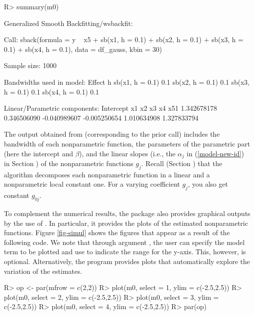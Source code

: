 \begin{Schunk}
\begin{Sinput}
R> summary(m0)
\end{Sinput}
\begin{Soutput}
Generalized Smooth Backfitting/wsbackfit:

Call: sback(formula = y ~ x5 + sb(x1, h = 0.1) + sb(x2, h = 0.1) + 
    sb(x3, h = 0.1) + sb(x4, h = 0.1), data = df_gauss, kbin = 30)

Sample size: 1000 

Bandwidths used in model:
 Effect          h  
 sb(x1, h = 0.1) 0.1
 sb(x2, h = 0.1) 0.1
 sb(x3, h = 0.1) 0.1
 sb(x4, h = 0.1) 0.1

Linear/Parametric components:
   Intercept           x1           x2           x3           x4          x51 
 1.342678178  0.346506090 -0.040989607 -0.005250654  1.010634908  1.327833794  
\end{Soutput}
\end{Schunk}

The output obtained from   (corresponding to the prior   call) includes the bandwidth of each nonparametric function, the parameters of the parametric part (here the intercept and $\beta$), and the linear slopes (i.e., the $\alpha_j$ in (\ref{model-new-id}) in Section ) of the nonparametric functions $g_j$. Recall (Section ) that the algorithm decomposes each nonparametric function in a linear and a nonparametric local constant one. For a varying coefficient $g_j$, you also get constant $g_{0j}$.

To complement the numerical results, the  package also provides graphical outputs by the use of . In particular, it provides the plots of the estimated nonparametric functions. Figure \ref{fig-simul} shows the figures that appear as a result of the following code. We note that through argument , the user can specify the model term to be plotted and use  to indicate the range for the y-axis.
This, however, is optional. Alternatively, the program provides plots that automatically explore the variation of the estimates.

\begin{Schunk}
\begin{Sinput}
R> op <- par(mfrow = c(2,2))
R> plot(m0, select = 1, ylim = c(-2.5,2.5))
R> plot(m0, select = 2, ylim = c(-2.5,2.5))
R> plot(m0, select = 3, ylim = c(-2.5,2.5))
R> plot(m0, select = 4, ylim = c(-2.5,2.5))
R> par(op)
\end{Sinput}
\end{Schunk}

